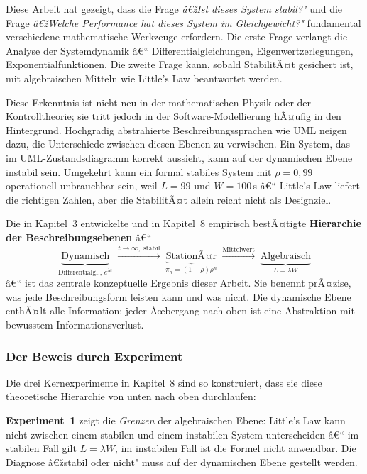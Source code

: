 ﻿\documentclass[a4paper,12pt]{scrreprt}
\theoremstyle{definition}
\begin{document}
Diese Arbeit hat gezeigt, dass die Frage \emph{â€žIst dieses System stabil?"}
und die Frage \emph{â€žWelche Performance hat dieses System im Gleichgewicht?"}
fundamental verschiedene mathematische Werkzeuge erfordern.  Die erste Frage
verlangt die Analyse der Systemdynamik â€“ Differentialgleichungen,
Eigenwertzerlegungen, Exponentialfunktionen.  Die zweite Frage kann, sobald
StabilitÃ¤t gesichert ist, mit algebraischen Mitteln wie Little's Law
beantwortet werden.

Diese Erkenntnis ist nicht neu in der mathematischen Physik oder der
Kontrolltheorie; sie tritt jedoch in der Software-Modellierung hÃ¤ufig in
den Hintergrund.  Hochgradig abstrahierte Beschreibungssprachen wie UML
neigen dazu, die Unterschiede zwischen diesen Ebenen zu verwischen.
Ein System, das im UML-Zustandsdiagramm korrekt aussieht, kann auf der
dynamischen Ebene instabil sein.  Umgekehrt kann ein formal stabiles System
mit $\rho = 0{,}99$ operationell unbrauchbar sein, weil $L = 99$ und
$W = 100$\,s â€“ Little's Law liefert die richtigen Zahlen, aber die StabilitÃ¤t
allein reicht nicht als Designziel.

Die in Kapitel~3 entwickelte und in Kapitel~8 empirisch bestÃ¤tigte
\textbf{Hierarchie der Beschreibungsebenen} â€“
\[
\underbrace{\text{Dynamisch}}_{\text{Differentialgl., } e^{\lambda t}}
\;\xrightarrow{t \to \infty,\;\text{stabil}}\;
\underbrace{\text{StationÃ¤r}}_{\pi_n = (1-\rho)\rho^n}
\;\xrightarrow{\text{Mittelwert}}\;
\underbrace{\text{Algebraisch}}_{L = \lambda W}
\]
â€“ ist das zentrale konzeptuelle Ergebnis dieser Arbeit.  Sie benennt prÃ¤zise,
was jede Beschreibungsform leisten kann und was nicht.  Die dynamische Ebene
enthÃ¤lt alle Information; jeder Ãœbergang nach oben ist eine Abstraktion mit
bewusstem Informationsverlust.

\subsubsection{Der Beweis durch Experiment}

Die drei Kernexperimente in Kapitel~8 sind so konstruiert, dass sie
diese theoretische Hierarchie von unten nach oben durchlaufen:

\textbf{Experiment~1} zeigt die \emph{Grenzen} der algebraischen Ebene:
Little's Law kann nicht zwischen einem stabilen und einem instabilen System
unterscheiden â€“ im stabilen Fall gilt $L = \lambda W$, im instabilen Fall
ist die Formel nicht anwendbar.  Die Diagnose â€žstabil oder nicht" muss auf
der dynamischen Ebene gestellt werden.
\end{document}
